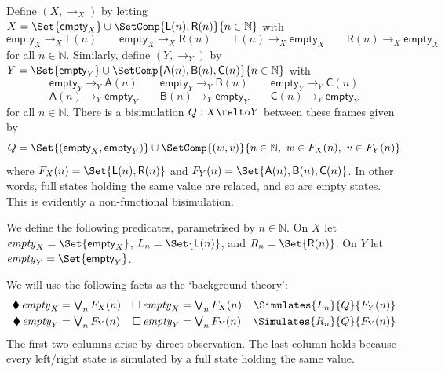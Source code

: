 \documentclass[a4paper,UKenglish,cleveref, autoref]{lipics-v2021}
\begin{document}
Define $(X, \to_X)$ by letting
\(
  X = \Set{\textsf{empty}_X} \cup \SetComp{\textsf{L}(n), \textsf{R}(n)}{n \in \mathbb{N}}
\)
with 
\[
  \textsf{empty}_X \to_X \textsf{L}(n)
  \qquad
  \textsf{empty}_X \to_X \textsf{R}(n)
  \qquad
  \textsf{L}(n) \to_X \textsf{empty}_X
  \qquad
  \textsf{R}(n) \to_X \textsf{empty}_X
\]
for all \(n \in \mathbb{N}\). Similarly, define $(Y, \to_Y)$ by 
\(
  Y = \Set{\textsf{empty}_Y} \cup \SetComp{\textsf{A}(n), \textsf{B}(n), \textsf{C}(n)}{n \in \mathbb{N}}
\)
with
\[
  \textsf{empty}_Y \to_Y \textsf{A}(n)
  \qquad
  \textsf{empty}_Y \to_Y \textsf{B}(n)
  \qquad
  \textsf{empty}_Y \to_Y \textsf{C}(n)
\]
\[
  \textsf{A}(n) \to_Y \textsf{empty}_Y
  \qquad
  \textsf{B}(n) \to_Y \textsf{empty}_Y
  \qquad
  \textsf{C}(n) \to_Y \textsf{empty}_Y
\]
for all \(n \in \mathbb{N}\). There is a bisimulation \(Q : X \relto Y\) between
these frames given by
\[
  Q = \Set{(\textsf{empty}_X, \textsf{empty}_Y)} \cup \SetComp{(w, v)}{n \in \mathbb{N},\ w \in F_X(n),\ v \in F_Y(n)}
\]
where \(F_X(n) = \Set{\textsf{L}(n), \textsf{R}(n)}\) and \(F_Y(n) =
\Set{\textsf{A}(n), \textsf{B}(n), \textsf{C}(n)}\). In other words, full states
holding the same value are related, and so are empty states. This is evidently a
non-functional bisimulation.

We define the following predicates, parametrised by \(n \in \mathbb{N}\). On
\(X\) let \(\mathit{empty}_X = \Set{\textsf{empty}_X}\), \(L_n =
\Set{\textsf{L}(n)}\), and \(R_n = \Set{\textsf{R}(n)}\). On \(Y\) let
\(\mathit{empty}_Y = \Set{\textsf{empty}_Y}\).

We will use the following facts as the `background theory':
\begin{align*}
  \blacklozenge\, \mathit{empty}_X &= \textstyle\bigvee_{n} F_X(n)
  &
  \Box\, \mathit{empty}_X &= \textstyle\bigvee_n F_X(n)
  &
  \Simulates{L_n}{Q}{F_Y(n)}
  \\
  \blacklozenge\, \mathit{empty}_Y &= \textstyle\bigvee_n F_Y(n)
  &
  \Box\, \mathit{empty}_Y &= \textstyle\bigvee_n F_Y(n)
  &
  \Simulates{R_n}{Q}{F_Y(n)}
\end{align*}
The first two columns arise by direct observation. The last column holds because
every left/right state is simulated by a full state holding the same value.
\end{document}
